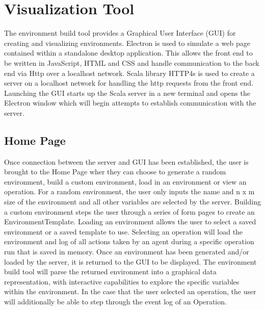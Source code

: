 \section{Visualization Tool}
The environment build tool provides a Graphical User Interface (GUI) for creating and visualizing environments.
Electron  is used to simulate a web page contained within a standalone desktop application.
This allows the front end to be written in JavaScript, HTML and CSS and handle communication to the back end via Http over a localhost network.
Scala library HTTP4s  is used to create a server on a localhost network for handling the http requests from the front end.
Launching the GUI starts up the Scala server in a new terminal and opens the Electron window which will begin attempts to establish communication with the server.


\subsection{Home Page}
Once connection between the server and GUI has been established, the user is brought to the Home Page wher they can choose to generate a random environment, build a custom environment, load in an environment or view an operation.
For a random environment, the user only inputs the name and n x m size of the environment and all other variables are selected by the server.
Building a custom environment steps the user through a series of form pages to create an EnvironmentTemplate.
Loading an environment allows the user to select a saved environment or a saved template to use.
Selecting an operation will load the environment and log of all actions taken by an agent during a specific operation run that is saved in memory.
Once an environment has been generated and/or loaded by the server, it is returned to the GUI to be displayed.
The environment build tool will parse the returned environment into a graphical data representation, with interactive capabilities to explore the specific variables within the environment.
In the case that the user selected an operation, the user will additionally be able to step through the event log of an Operation.


